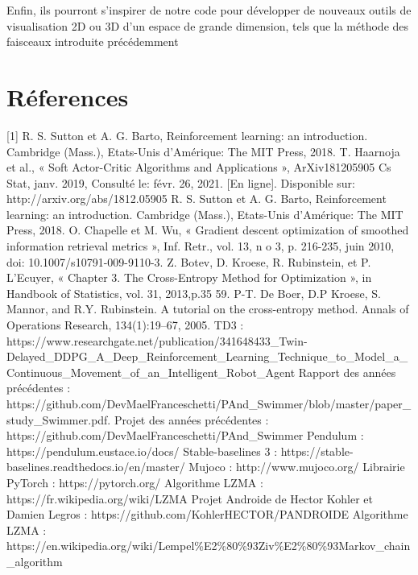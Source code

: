 \documentclass[12pt]{article}
\begin{document}
Enfin, ils pourront s'inspirer de notre code pour développer de nouveaux outils de visualisation 2D ou 3D d'un espace de grande dimension, tels que la méthode des faisceaux introduite précédemment \\


\section{Réferences} \label{second}
[1] R. S. Sutton et A. G. Barto, Reinforcement learning: an introduction. Cambridge (Mass.),
Etats-Unis d’Amérique: The MIT Press, 2018. \label{[1]} \newline
[2] T. Haarnoja et al., « Soft Actor-Critic Algorithms and Applications », ArXiv181205905 Cs
Stat, janv. 2019, Consulté le: févr. 26, 2021. [En ligne]. Disponible sur:
http://arxiv.org/abs/1812.05905   \label{[2]} \newline
[3] R. S. Sutton et A. G. Barto, Reinforcement learning: an introduction. Cambridge (Mass.),
Etats-Unis d’Amérique: The MIT Press, 2018.\label{[3]} \newline
[4] O. Chapelle et M. Wu, « Gradient descent optimization of smoothed information retrieval
metrics », Inf. Retr., vol. 13, n
o 3, p. 216-235, juin 2010, doi: 10.1007/s10791-009-9110-3.\label{[4]} \newline
[5] Z. Botev, D. Kroese, R. Rubinstein, et P. L’Ecuyer, « Chapter 3. The Cross-Entropy
Method for Optimization », in Handbook of Statistics, vol. 31, 2013,p.35 59. \label{[5]} \newline
[6] P-T. De Boer, D.P Kroese, S. Mannor, and R.Y. Rubinstein. A tutorial on the cross-entropy method. Annals of Operations Research, 134(1):19–67, 2005.\label{[6]} \newline
[7] TD3 : https://www.researchgate.net/publication/341648433\_Twin-Delayed\_DDPG\_A\_Deep\_Reinforcement\_Learning\_Technique\_to\_Model\_a\_Continuous\_Movement\_of\_an\_Intelligent\_Robot\_Agent \label{[7]} \newline
[8] Rapport des années précédentes : https://github.com/DevMaelFranceschetti/PAnd\_Swimmer/blob/master/paper\_study\_Swimmer.pdf. \label{[8]} \newline
[9] Projet des années précédentes : https://github.com/DevMaelFranceschetti/PAnd\_Swimmer \label{[9]}\newline
[10] Pendulum : https://pendulum.eustace.io/docs/ \label{[10]}\newline
[11] Stable-baselines 3 : https://stable-baselines.readthedocs.io/en/master/  \label{[11]}\newline
[12] Mujoco : http://www.mujoco.org/ \label{[12]}\newline
[13] Librairie PyTorch : https://pytorch.org/  \label {[13]}\newline
[14] Algorithme LZMA : https://fr.wikipedia.org/wiki/LZMA \label{[14]}\newline
[15] Projet Androide de Hector Kohler et Damien Legros : https://github.com/KohlerHECTOR/PANDROIDE \label{[15]}\newline 
[16] Algorithme LZMA : https://en.wikipedia.org/wiki/Lempel\%E2\%80\%93Ziv\%E2\%80\%93Markov\_chain\_algorithm \label{[16]} \newline
\end{document}
